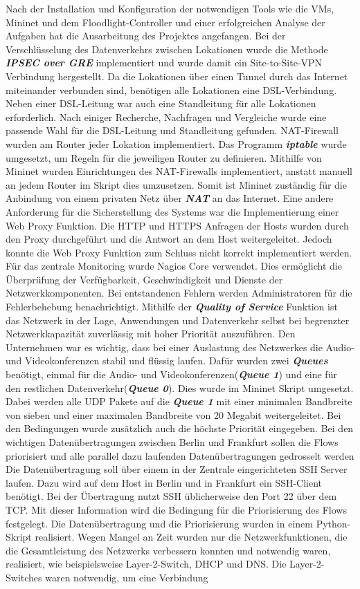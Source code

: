 \documentclass[fontsize=12pt,paper=a4,open=any,parskip=half,
  twoside=false,toc=listof,toc=bibliography,fleqn,leqno,
  captions=nooneline,captions=tableabove,british]{scrbook}
\begin{document}
{Nach der Installation und Konfiguration der notwendigen Tools wie die VMs, Mininet und dem Floodlight-Controller und einer erfolgreichen Analyse der Aufgaben hat die Ausarbeitung des Projektes angefangen. Bei der Verschlüsselung des Datenverkehrs zwischen Lokationen wurde die Methode \textit{\textbf{IPSEC over GRE}} implementiert und wurde damit ein Site-to-Site-VPN Verbindung hergestellt. Da die Lokationen über einen Tunnel durch das Internet miteinander verbunden sind, benötigen alle Lokationen eine DSL-Verbindung. Neben einer DSL-Leitung war auch eine Standleitung für alle Lokationen erforderlich. Nach einiger Recherche, Nachfragen und Vergleiche wurde eine passende Wahl für die DSL-Leitung und Standleitung gefunden. NAT-Firewall wurden am Router jeder Lokation implementiert. Das Programm \textit{\textbf{iptable}} wurde umgesetzt, um Regeln für die jeweiligen Router zu definieren. Mithilfe von Mininet wurden Einrichtungen des NAT-Firewalls implementiert, anstatt manuell an jedem Router im Skript dies umzusetzen. Somit ist Mininet zuständig für die Anbindung von einem privaten Netz über \textit{\textbf{NAT}} an das Internet. Eine andere Anforderung für die Sicherstellung des Systems war die Implementierung einer Web Proxy Funktion. Die HTTP und HTTPS Anfragen der Hosts wurden durch den Proxy durchgeführt und die Antwort an dem Host weitergeleitet. Jedoch konnte die Web Proxy Funktion zum Schluss nicht korrekt implementiert werden. Für das zentrale Monitoring wurde Nagios Core verwendet. Dies ermöglicht die Überprüfung der Verfügbarkeit, Geschwindigkeit und Dienste der Netzwerkkomponenten. Bei entstandenen Fehlern werden Administratoren für die Fehlerbehebung benachrichtigt. Mithilfe der \textit{\textbf{Quality of Service}} Funktion ist das Netzwerk in der Lage, Anwendungen und Datenverkehr selbst bei begrenzter Netzwerkkapazität zuverlässig mit hoher Priorität auszuführen. Den Unternehmen war es wichtig, dass bei einer Auslastung des Netzwerkes die Audio- und Videokonferenzen stabil und flüssig laufen. Dafür wurden zwei \textit{\textbf{Queues}} benötigt, einmal für die Audio- und Videokonferenzen(\textit{\textbf{Queue 1}}) und eine für den restlichen Datenverkehr(\textit{\textbf{Queue 0}}). Dies wurde im Mininet Skript umgesetzt. Dabei werden alle UDP Pakete auf die \textit{\textbf{Queue 1}} mit einer minimalen Bandbreite von sieben und einer maximalen Bandbreite von 20 Megabit weitergeleitet. Bei den Bedingungen wurde zusätzlich auch die höchste Priorität eingegeben. Bei den wichtigen Datenübertragungen zwischen Berlin und Frankfurt sollen die Flows priorisiert und alle parallel dazu laufenden Datenübertragungen gedrosselt werden Die Datenübertragung soll über einem in der Zentrale eingerichteten SSH Server laufen. Dazu wird auf dem Host in Berlin und in Frankfurt ein SSH-Client benötigt. Bei der Übertragung nutzt SSH üblicherweise den Port 22 über dem TCP. Mit dieser Information wird die Bedingung für die Priorisierung des Flows festgelegt. Die Datenübertragung und die Priorisierung wurden in einem Python-Skript realisiert. Wegen Mangel an Zeit wurden nur die Netzwerkfunktionen, die die Gesamtleistung des Netzwerks verbessern konnten und notwendig waren, realisiert, wie beispielsweise Layer-2-Switch, DHCP und DNS. Die Layer-2-Switches waren notwendig, um eine Verbindung }
\end{document}

